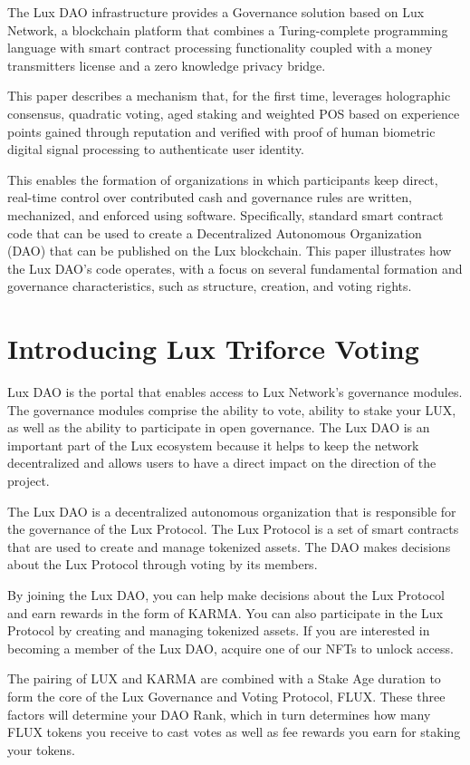 \documentclass[11pt]{article}
\begin{document}
The Lux DAO infrastructure provides a Governance solution based on Lux Network, a blockchain platform that combines a Turing-complete programming language with smart contract processing functionality coupled with a money transmitters license and a zero knowledge privacy bridge.


This paper describes a mechanism that, for the first time, leverages holographic consensus, quadratic voting, aged staking and weighted POS based on experience points gained through reputation and verified with proof of human biometric digital signal processing to authenticate user identity.


This enables the formation of organizations in which participants keep direct, real-time control over contributed cash and governance rules are written, mechanized, and enforced using software. Specifically, standard smart contract code that can be used to create a Decentralized Autonomous Organization (DAO) that can be published on the Lux blockchain. This paper illustrates how the Lux DAO's code operates, with a focus on several fundamental formation and governance characteristics, such as structure, creation, and voting rights.


\section{Introducing Lux Triforce Voting}

Lux DAO is the portal that enables access to Lux Network's governance modules. The governance modules comprise the ability to vote, ability to stake your LUX, as well as the ability to participate in open governance. The Lux DAO is an important part of the Lux ecosystem because it helps to keep the network decentralized and allows users to have a direct impact on the direction of the project.


The Lux DAO is a decentralized autonomous organization that is responsible for the governance of the Lux Protocol. The Lux Protocol is a set of smart contracts that are used to create and manage tokenized assets. The DAO makes decisions about the Lux Protocol through voting by its members.


By joining the Lux DAO, you can help make decisions about the Lux Protocol and earn rewards in the form of KARMA. You can also participate in the Lux Protocol by creating and managing tokenized assets. If you are interested in becoming a member of the Lux DAO, acquire one of our NFTs to unlock access.


The pairing  of LUX  and KARMA are combined with a Stake Age duration to form the core of the Lux Governance and Voting Protocol, FLUX. These three factors will determine your DAO Rank, which in turn determines how many FLUX tokens you receive to cast votes as well as fee rewards you earn for staking your tokens.
\end{document}
